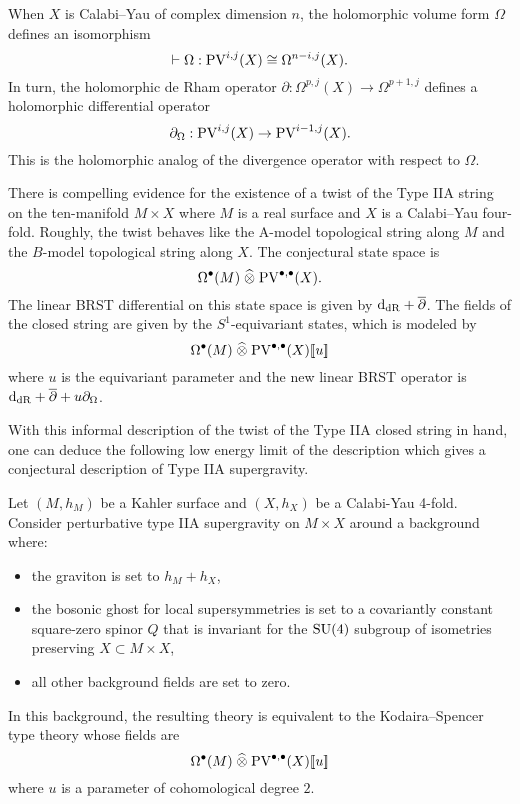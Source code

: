 \documentclass[11pt]{amsart}
\def\pv{{\rm PV}}
\def\PV{{\rm PV}}
\begin{document}
When $X$ is Calabi--Yau of complex dimension $n$, the holomorphic volume form $\Omega$ defines an isomorphism
\[
  \vdash \Omega : \pv^{i,j}(X) \cong \Omega^{n-i, j}(X).
\]
In turn, the holomorphic de Rham operator $\partial : \Omega^{p, j}(X) \to \Omega^{p+1,j}$ defines a holomorphic differential operator
\[
  \partial_{\Omega} : \pv^{i,j}(X) \to \pv^{i-1,j}(X) .
\]
This is the holomorphic analog of the divergence operator with respect to $\Omega$.

There is compelling evidence \cite{CLsugra} for the existence of a twist of the Type IIA string on the ten-manifold $M \times X$ where $M$ is a real surface and $X$ is a Calabi--Yau four-fold.
Roughly, the twist behaves like the A-model topological string along $M$ and the $B$-model topological string along $X$.
The conjectural state space is
\[
  \Omega^\bu(M) \; \Hat{\otimes} \; \PV^{\bu, \bu} (X) .
\]
The linear BRST differential on this state space is given by ${\rm d}_{\rm dR} + \overline{\partial}$.
The fields of the closed string are given by the $S^1$-equivariant states, which is modeled \cite{CLbcov} by
\[
  \Omega^\bu(M) \; \Hat{\otimes} \; \PV^{\bu, \bu} (X) [\![u]\!]
\]
where $u$ is the equivariant parameter and the new linear BRST operator is ${\rm d}_{\rm dR} + \overline{\partial} + u \partial_\Omega$.

With this informal description of the twist of the Type IIA closed string in hand, one can deduce the following low energy limit of the description which gives a conjectural description of Type IIA supergravity.

\begin{conj}
  Let $(M,h_{M})$ be a Kahler surface and $(X, h_{X})$ be a Calabi-Yau 4-fold.
  Consider perturbative type IIA supergravity on $M\times X$ around a background where:
  \begin{itemize}
    \item the graviton is set to $h_{M}+ h_{X}$,
    \item the bosonic ghost for local supersymmetries is set to a covariantly constant square-zero spinor $Q$ that is invariant for the $\rm SU(4)$ subgroup of isometries preserving $X\subset M\times X$,
    \item all other background fields are set to zero.
  \end{itemize}
  In this background, the resulting theory is equivalent to the Kodaira--Spencer type theory whose fields are
  \[
    \Omega^{\bullet}(M) \; \Hat{\otimes} \; \PV^{\bullet, \bullet}(X)[\![u]\!]
  \]
  where $u$ is a parameter of cohomological degree $2$.
\end{conj}
\end{document}
